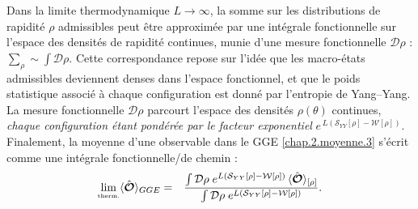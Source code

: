 Dans la limite thermodynamique $L \to \infty$, la somme sur les distributions de rapidité $\rho$ admissibles peut être approximée par une intégrale fonctionnelle sur l’espace des densités de rapidité continues, munie d’une mesure fonctionnelle $\mathcal{D}\rho$ : 
\(
\sum_{\rho } \sim \int \mathcal{D} \rho .
\)
Cette correspondance repose sur l’idée que les macro-états admissibles deviennent denses dans l’espace fonctionnel, et que le poids statistique associé à chaque configuration est donné par l’entropie de Yang–Yang.
La mesure fonctionnelle $\mathcal{D}\rho$ parcourt l’espace des densités
$\rho(\theta)$ continues, \emph{chaque configuration étant pondérée par le
facteur exponentiel}
\(
e^{\,L(\mathcal{S}_{YY}[\rho]-\mathcal{W}[\rho])}.
\)
Finalement, la moyenne d'une observable dans le GGE \eqref{chap.2.moyenne.3} s’écrit comme une intégrale fonctionnelle/de chemin :
\begin{eqnarray}
	\underset{\mbox{\tiny therm.}}{\lim} \langle \hat{\bm{\mathcal{O}}} \rangle_{GGE} & = & \frac{\int \mathcal{D} \rho \; e^{L (\mathcal{S}_{YY}[\rho] - \mathcal{W}[\rho])} \, \langle\hat{\bm{\mathcal{O}}}\rangle_{[\rho]}}{\int \mathcal{D} \rho \; e^{L (\mathcal{S}_{YY}[\rho] - \mathcal{W}[\rho])}}. \label{chap:TBA:eq:ensemble_average}
\end{eqnarray}




